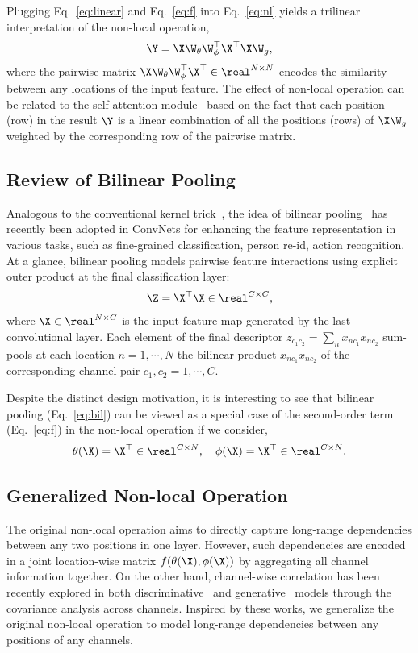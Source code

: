 \documentclass{article}
\begin{document}
Plugging Eq.~\ref{eq:linear} and Eq.~\ref{eq:f} into Eq.~\ref{eq:nl} yields a trilinear interpretation of the non-local operation,
\begin{align}
  \label{eq:tri}
  \Y = \X \W_\theta \W_\phi^\top \X^\top \X \W_g,
\end{align}
where the pairwise matrix $\X \W_\theta \W_\phi^\top \X^\top \in \real^{N \times N}$ encodes the similarity between any locations of the input feature.
The effect of non-local operation can be related to the self-attention module~\cite{VaswaniSPUJGKP17} based on the fact that each position (row) in the result $\Y$ is a linear combination of all the positions (rows) of $\X \W_g$ weighted by the corresponding row of the pairwise matrix.
% 
% 
\subsection{Review of Bilinear Pooling}
Analogous to the conventional kernel trick~\cite{scholkopf2001learning}, the idea of bilinear pooling~\cite{bilinear} has recently been adopted in ConvNets for enhancing the feature representation in various tasks, such as fine-grained classification, person re-id, action recognition.
At a glance, bilinear pooling models pairwise feature interactions using explicit outer product at the final classification layer:
\begin{align}
  \label{eq:bil}
  \Z = \X^\top \X \in \real^{C \times C},
\end{align}
where $\X \in \real^{N \times C}$ is the input feature map generated by the last convolutional layer.
Each element of the final descriptor $z_{c_1 c_2} = \sum_n x_{n c_1} x_{n c_2}$ sum-pools at each location $n = 1, \cdots, N$ the bilinear product $x_{n c_1} x_{n c_2}$ of the corresponding channel pair $c_1, c_2 = 1, \cdots, C$.

Despite the distinct design motivation, it is interesting to see that bilinear pooling (Eq.~\ref{eq:bil}) can be viewed as a special case of the second-order term (Eq.~\ref{eq:f}) in the non-local operation if we consider,
\begin{align}
  \theta(\X) = \X^\top \in \real^{C \times N}, \quad \phi(\X) = \X^{\top} \in \real^{C \times N}.
\end{align}
% 
% 
\subsection{Generalized Non-local Operation}
The original non-local operation aims to directly capture long-range dependencies between any two positions in one layer.
However, such dependencies are encoded in a joint location-wise matrix $f(\theta(\X), \phi(\X))$ by aggregating all channel information together.
On the other hand, channel-wise correlation has been recently explored in both discriminative~\cite{bilinear} and generative~\cite{Ustyuzhaninov2017WhatDI} models through the covariance analysis across channels.
Inspired by these works, we generalize the original non-local operation to model long-range dependencies between any positions of any channels.
\end{document}
